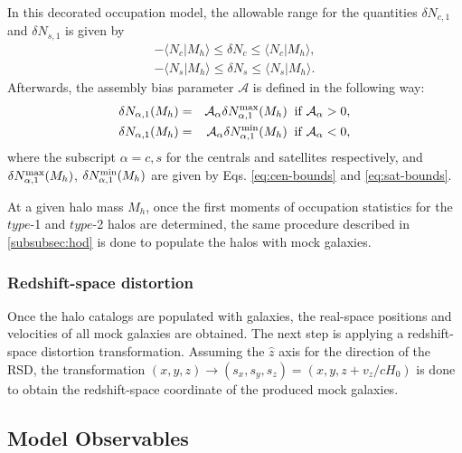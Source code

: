 \documentclass[12pt, preprint]{emulateapj}
\begin{document}
In this decorated occupation model, the allowable range for the quantities $\delta N_{c,1}$ and $\delta N_{s,1}$ is given by 
\begin{eqnarray}
-\langle N_{c} | M_{h}\rangle \leq \delta N_{c} \leq \langle N_{c} | M_{h}\rangle
 , \label{eq:cen-bounds} \\
-\langle N_{s} | M_{h}\rangle \leq \delta N_{s} \leq \langle N_{s} | M_{h}\rangle. \label{eq:sat-bounds}
\end{eqnarray}
Afterwards, the assembly bias parameter $\mathcal{A}$ is defined in the following way:
\begin{eqnarray}
\delta N_{\alpha , 1}(M_{h}) &=& \mathcal{A_\alpha} \delta N_{\alpha , 1}^{\rm max}(M_{h}) \; \; \rm{if} \; \mathcal{A_\alpha} > 0,  \\
\delta N_{\alpha , 1}(M_{h}) &=& \mathcal{A_\alpha} \delta N_{\alpha , 1}^{\rm min}(M_{h}) \; \; \rm{if} \; \mathcal{A_\alpha} < 0,
\end{eqnarray}
where the subscript $\alpha = c , s$ for the centrals and satellites respectively, and $\delta N_{\alpha , 1}^{\rm max}(M_{h})$, $\delta N_{\alpha , 1}^{\rm min}(M_{h})$ are given by Eqs. \ref{eq:cen-bounds} and \ref{eq:sat-bounds}. 

At a given halo mass $M_{h}$, once the first moments of occupation statistics for the $type$-1 and $type$-2 halos are determined, the same procedure described in \ref{subsubsec:hod} is done to populate the halos with mock galaxies.

\subsubsection{Redshift-space distortion}

Once the halo catalogs are populated with galaxies, the real-space positions and velocities of all mock galaxies are obtained. The next step is applying a redshift-space distortion transformation. Assuming the $\hat{z}$ axis for the direction of the RSD, the transformation $(x,y,z) \rightarrow (s_x,s_y,s_z) = (x , y ,z + v_z/cH_{0})$ is done to obtain the redshift-space coordinate of the produced mock galaxies.   

\subsection{Model Observables}
\end{document}
